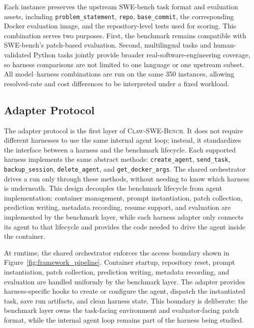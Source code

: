 \documentclass{llmxive}
\begin{document}
Each instance preserves the upstream SWE-bench task format and evaluation assets, including \texttt{problem\_statement}, \texttt{repo}, \texttt{base\_commit}, the corresponding Docker evaluation image, and the repository-level tests used for scoring. This combination serves two purposes. First, the benchmark remains compatible with SWE-bench's patch-based evaluation. Second, multilingual tasks and human-validated Python tasks jointly provide broader real-software-engineering coverage, so harness comparisons are not limited to one language or one upstream subset. All model--harness combinations are run on the same 350 instances, allowing resolved-rate and cost differences to be interpreted under a fixed workload.

\subsection{Adapter Protocol}
\label{sec:adapter_protocol}

The adapter protocol is the first layer of \textsc{Claw-SWE-Bench}. It does not require different harnesses to use the same internal agent loop; instead, it standardizes the interface between a harness and the benchmark lifecycle. Each supported harness implements the same abstract methods: \texttt{create\_agent}, \texttt{send\_task}, \texttt{backup\_session}, \texttt{delete\_agent}, and \texttt{get\_docker\_args}. The shared orchestrator drives a run only through these methods, without needing to know which harness is underneath. This design decouples the benchmark lifecycle from agent implementation: container management, prompt instantiation, patch collection, prediction writing, metadata recording, resume support, and evaluation are implemented by the benchmark layer, while each harness adapter only connects its agent to that lifecycle and provides the code needed to drive the agent inside the container.

At runtime, the shared orchestrator enforces the access boundary shown in Figure~\ref{fig:framework_pipeline}. Container startup, repository reset, prompt instantiation, patch collection, prediction writing, metadata recording, and evaluation are handled uniformly by the benchmark layer. The adapter provides harness-specific hooks to create or configure the agent, dispatch the instantiated task, save run artifacts, and clean harness state. This boundary is deliberate: the benchmark layer owns the task-facing environment and evaluator-facing patch format, while the internal agent loop remains part of the harness being studied.
\end{document}
